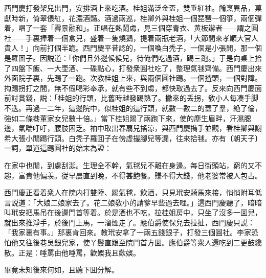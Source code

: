 西門慶打發架兒出門，安排酒上來吃酒。桂姐滿泛金盃，雙垂紅袖。餚烹異品，菓獻時新，倚翠偎紅，花濃酒豔。酒過兩巡，桂卿外與桂姐一個琵琶一個箏，兩個彈着，唱了一套「霽景融和」。正唱在熱鬧䖏，見三個穿青衣、黄板辮者——謂之圓社——手裏捧着一個盒兒，盛着一隻燒鵝，提着兩瓶老酒，「大節間來孝順大官人貴人！」向前打個半跪。西門慶平昔認的，一個喚白秃子，一個是小張閒，那一個是羅囬子。因説道：「你們且外邊候候兒，待俺們吃過酒，踢三跑。」于是向桌上拾了四盤下飯、一大壶酒、一碟點心，打發衆圓社吃了，整理氣毬齊備。西門慶出來外面院子裏，先踢了一跑。次教桂姐上來，與兩個圓社踢。一個揸頭，一個對障。抅踢拐打之間，無不假喝彩奉承，就有些不到䖏，都快取過去了。反來向西門慶面前討賞錢，説：「桂姐的行頭，比舊時越發踢熟了。撇來的丢拐，敎小人每凑手脚不迭。再過一二年，這邊院中，似桂姐的這行頭，就數一數二的蓋了羣，絶了倫，強如二條巷董家女兒數十倍。」當下桂姐踢了兩跑下來，使的塵生眉畔，汗濕腮邊，氣喘吁吁，腰肢困乏。袖中取出春扇兒搖涼，與西門慶擕手並觀，看桂卿與謝希大張小閒踢行頭。白秃子羅囬子在傍虚撮腳兒等漏，往來拾毬。亦有〔朝天子〕一詞，單道這踢圓社的始末為證：

\begin{myquote}
在家中也閒，到處刮涎。生理全不幹，氣毬兒不離在身邊。每日街頭站，窮的又不趨，富貴他偏羡。従早晨直到晚，不得甚飽餐。賺不得大錢，他老婆常被人包占。
\end{myquote}

西門慶正看着衆人在院内打雙陸、踢氣毬，飲酒，只見玳安騎馬來接，悄悄附耳低言説道：「大娘二娘家去了。花二娘敎小的請爹早些過去哩。」這西門慶聽了，暗暗叫玳安把馬吊在後邊門首等着。於是酒也不吃，拉桂姐房中，只坐了沒多一囬兒，就出來推淨手，於後門上馬，一溜煙走了。應伯爵使保兒去拉扯，西門慶只説：「我家裏有事。」那裏肯回來。教玳安拿了一兩五錢銀子，打發三個圓社。李家恐怕他又往後巷吳銀兒家，使丫鬟直跟至院門首方囬。應伯爵等衆人還吃到二更鼓纔散。正是：唾罵由他唾罵，歡娛我且歡娛。

畢竟未知後來何如，且聽下囬分解。

